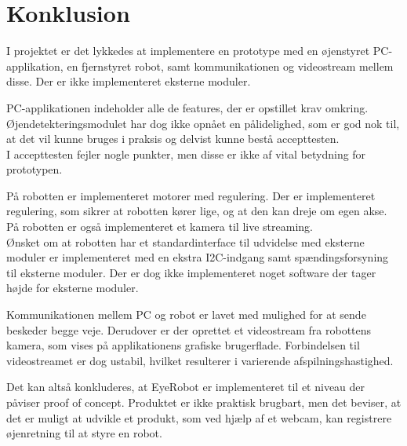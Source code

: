 %

%
	
\chapter{Konklusion}		
I projektet er det lykkedes at implementere en prototype med en øjenstyret PC-applikation, en fjernstyret robot, samt kommunikationen og videostream mellem disse.
Der er ikke implementeret eksterne moduler.

PC-applikationen indeholder alle de features, der er opstillet krav omkring. Øjendetekteringsmodulet har dog ikke opnået en pålidelighed, som er god nok til, at det vil kunne bruges i praksis og delvist kunne bestå accepttesten.  \\
I accepttesten fejler nogle punkter, men disse er ikke af vital betydning for prototypen.

På robotten er implementeret motorer med regulering.
Der er implementeret regulering, som sikrer at robotten kører lige, og at den kan dreje om egen akse. \\
På robotten er også implementeret et kamera til live streaming. \\
Ønsket om at robotten har et standardinterface til udvidelse med eksterne moduler er implementeret med en ekstra I2C-indgang samt spændingsforsyning til eksterne moduler.
Der er dog ikke implementeret noget software der tager højde for eksterne moduler. 

Kommunikationen mellem PC og robot er lavet med mulighed for at sende beskeder begge veje. 
Derudover er der oprettet et videostream fra robottens kamera, som vises på applikationens grafiske brugerflade. 
Forbindelsen til videostreamet er dog ustabil, hvilket resulterer i varierende afspilningshastighed.

Det kan altså konkluderes, at EyeRobot er implementeret til et niveau der påviser proof of concept. 
Produktet er ikke praktisk brugbart, men det beviser, at det er muligt at udvikle et produkt, som ved hjælp af et webcam, kan registrere øjenretning til at styre en robot. 
    
%